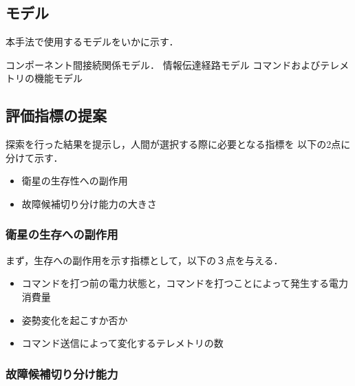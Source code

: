 \documentclass[11pt]{jsarticle}%
\begin{document}
\begin{multicols}{2}
\subsection{モデル}%
本手法で使用するモデルをいかに示す．

  コンポーネント間接続関係モデル．
  情報伝達経路モデル
  コマンドおよびテレメトリの機能モデル%

  \subsection{評価指標の提案}
  探索を行った結果を提示し，人間が選択する際に必要となる指標を
  以下の2点に分けて示す．
  \begin{itemize}
    \item 衛星の生存性への副作用
    \item 故障候補切り分け能力の大きさ
  \end{itemize}

  \subsubsection{衛星の生存への副作用}
  まず，生存への副作用を示す指標として，以下の３点を与える．
  \begin{itemize}
    \item コマンドを打つ前の電力状態と，コマンドを打つことによって発生する電力消費量
    \item 姿勢変化を起こすか否か
    \item コマンド送信によって変化するテレメトリの数
  \end{itemize}

  \subsubsection{故障候補切り分け能力}


\end{multicols}
\end{document}
